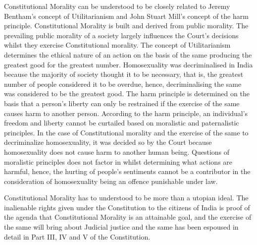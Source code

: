\begin{multicols}{2}
\noi
Constitutional Morality can be understood to be closely related to Jeremy Bentham’s concept
of Utilitarianism and John Stuart Mill’s concept of the harm principle. Constitutional
Morality is built and derived from public morality. The prevailing public morality of a
society largely influences the Court’s decisions whilst they exercise Constitutional morality.
The concept of Utilitarianism determines the ethical nature of an action on the basis of the
same producing the greatest good for the greatest number. Homosexuality was decriminalised
in India because the majority of society thought it to be necessary, that is, the greatest number
of people considered it to be overdue, hence, decriminalising the same was considered to be
the greatest good. The harm principle is determined on the basis that a person’s liberty can
only be restrained if the exercise of the same causes harm to another person. According to the
harm principle, an individual’s freedom and liberty cannot be curtailed based on moralistic
and paternalistic principles. In the case of Constitutional morality and the exercise of the
same to decriminalize homosexuality, it was decided so by the Court because homosexuality
does not cause harm to another human being. Questions of moralistic principles does not
factor in whilst determining what actions are harmful, hence, the hurting of people’s
sentiments cannot be a contributor in the consideration of homosexuality being an offence
punishable under law.


\noi
Constitutional Morality has to understood to be more than a utopian ideal. The inalienable
rights given under the Constitution to the citizens of India is proof of the agenda that
Constitutional Morality is an attainable goal, and the exercise of the same will bring about
Judicial justice and the same has been espoused in detail in Part III, IV and V of the
Constitution.


\end{multicols}
